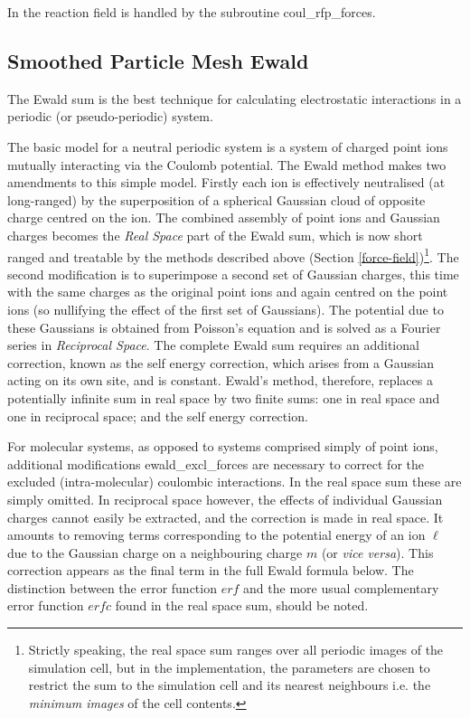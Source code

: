 In \D the reaction field is handled by the
subroutine {\sc coul\_rfp\_forces}.

\subsection{Smoothed Particle Mesh Ewald}
\label{SPME}

The Ewald sum \cite{allen-89a} is the best
technique for calculating electrostatic interactions in a periodic
(or pseudo-periodic) system.

The basic model for a neutral periodic system is a system of
charged point ions mutually interacting via the Coulomb potential.
The Ewald method makes two amendments to this simple model.
Firstly each ion is effectively neutralised (at long-ranged) by the
superposition of a spherical Gaussian
cloud of opposite charge centred on the ion.  The combined
assembly of point ions and Gaussian
charges becomes the {\em Real Space} part of the Ewald
sum, which is now short ranged and
treatable by the methods described above (Section
\ref{force-field})\footnote{Strictly speaking, the real space sum
ranges over all periodic images of the simulation cell, but in the
\D implementation, the parameters are chosen to restrict the sum
to the simulation cell and its nearest neighbours i.e. the {\em
minimum images} of the cell contents.}.  The second modification
is to superimpose a second set of Gaussian charges, this time with
the same charges as the original point ions and again centred on
the point ions (so nullifying the effect of the first set of
Gaussians).  The potential due to these
Gaussians is obtained from Poisson's
equation and is solved as a Fourier series in {\em Reciprocal
Space}.  The complete Ewald sum requires an
additional correction, known as the self energy correction, which
arises from a Gaussian acting on its
own site, and is constant.  Ewald's method, therefore, replaces a
potentially infinite sum in real space by two finite sums: one in
real space and one in reciprocal space; and the self energy
correction.

For molecular systems, as opposed to systems comprised simply of
point ions, additional modifications {\sc ewald\_excl\_forces} are
necessary to correct for the excluded (intra-molecular) coulombic
interactions. In the real space sum these are simply omitted.  In
reciprocal space however, the effects of individual
Gaussian charges cannot easily be
extracted, and the correction is made in real space.  It amounts
to removing terms corresponding to the potential energy of an ion
$\ell$ due to the Gaussian charge on a
neighbouring charge $m$ (or {\em vice versa}).  This correction
appears as the final term in the full Ewald
formula below.  The distinction between the error function $erf$
and the more usual complementary error function $erfc$ found in
the real space sum, should be noted.

